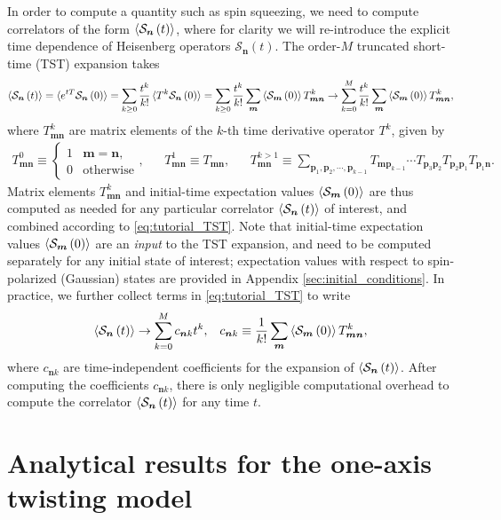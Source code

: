 \documentclass[aps,pra,twocolumn,longbibliography]{revtex4-2}
\renewcommand{\t}{\text} %
\newcommand{\f}[2]{\dfrac{#1}{#2}} %
\newcommand{\p}[1]{\left( #1 \right)} %
\renewcommand{\v}{\bm} %
\newcommand{\bk}{\braket} %
\renewcommand{\S}{\mathcal{S}}
\newcommand{\1}{\mathds{1}}
\begin{document}
In order to compute a quantity such as spin squeezing, we need to
compute correlators of the form $\bk{\S_{\v n}\p{t}}$, where for
clarity we will re-introduce the explicit time dependence of
Heisenberg operators $\S_{\v n}\p{t}$.  The order-$M$ truncated
short-time (TST) expansion takes
\begin{align}
  \bk{\S_{\v n}\p{t}}
  = \bk{e^{tT}\S_{\v n}\p{0}}
  = \sum_{k\ge0} \f{t^k}{k!} \bk{T^k\S_{\v n}\p{0}}
  = \sum_{k\ge0} \f{t^k}{k!}
  \sum_{\v m} \bk{\S_{\v m}\p{0}} T^k_{\v m\v n}
  \to \sum_{k=0}^M \f{t^k}{k!}
  \sum_{\v m} \bk{\S_{\v m}\p{0}} T^k_{\v m\v n},
  \label{eq:tutorial_TST}
\end{align}
where $T^k_{\v m\v n}$ are matrix elements of the $k$-th time
derivative operator $T^k$, given by
\begin{align}
  T^0_{\v m\v n} \equiv
  \begin{cases}
    1 & \v m = \v n, \\
    0 & \t{otherwise}
  \end{cases},
  &&
  T^1_{\v m\v n} \equiv T_{\v m\v n},
  &&
  T^{k>1}_{\v m\v n}
  \equiv \sum_{\v p_1,\v p_2,\cdots,\v p_{k-1}}
  T_{\v m\v p_{k-1}} \cdots T_{\v p_3\v p_2}
  T_{\v p_2\v p_1} T_{\v p_1\v n}.
\end{align}
Matrix elements $T^k_{\v m\v n}$ and initial-time expectation values
$\bk{\S_{\v m}\p{0}}$ are thus computed as needed for any particular
correlator $\bk{\S_{\v n}\p{t}}$ of interest, and combined according
to \eqref{eq:tutorial_TST}.  Note that initial-time expectation values
$\bk{\S_{\v m}\p{0}}$ are an {\it input} to the TST expansion, and
need to be computed separately for any initial state of interest;
expectation values with respect to spin-polarized (Gaussian) states
are provided in Appendix \ref{sec:initial_conditions}.  In practice,
we further collect terms in \eqref{eq:tutorial_TST} to write
\begin{align}
  \bk{\S_{\v n}\p{t}} \to \sum_{k=0}^M c_{\v n k} t^k,
  &&
  c_{\v n k}
  \equiv \f1{k!} \sum_{\v m} \bk{\S_{\v m}\p{0}} T^k_{\v m\v n},
  \label{eq:tutorial_corr}
\end{align}
where $c_{\v n k}$ are time-independent coefficients for the expansion
of $\bk{\S_{\v n}\p{t}}$.  After computing the coefficients
$c_{\v n k}$, there is only negligible computational overhead to
compute the correlator $\bk{\S_{\v n}\p{t}}$ for any time $t$.

\section{Analytical results for the one-axis twisting model}
\label{sec:OAT}
\end{document}
